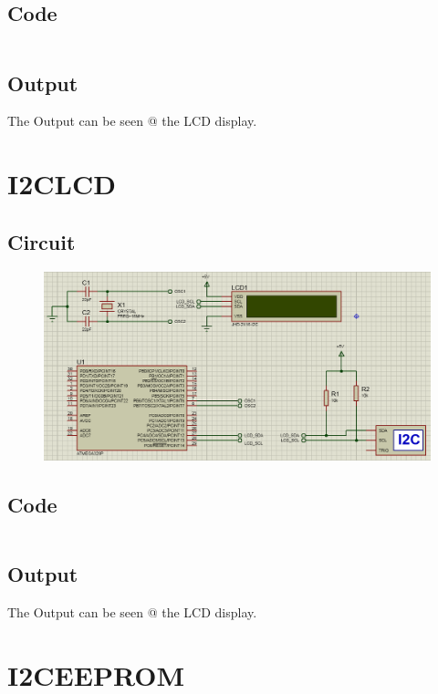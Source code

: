 \documentclass[oneside]{book}
\begin{document}
\subsection{Code}
\inputminted[bgcolor=black]{c}{./programFiles/SPILCD.c}

\subsection{Output}
\quad The Output can be seen @ the LCD display.

\section{I2CLCD}
\subsection{Circuit}
\begin{figure}[H]
    \centering
    \includegraphics[height=0.2\textheight]{I2CLCD.png}
\end{figure}
\subsection{Code}
\inputminted[bgcolor=black]{c}{./programFiles/I2CLCD.c}

\subsection{Output}
\quad The Output can be seen @ the LCD display.



\section{I2CEEPROM}
\end{document}
